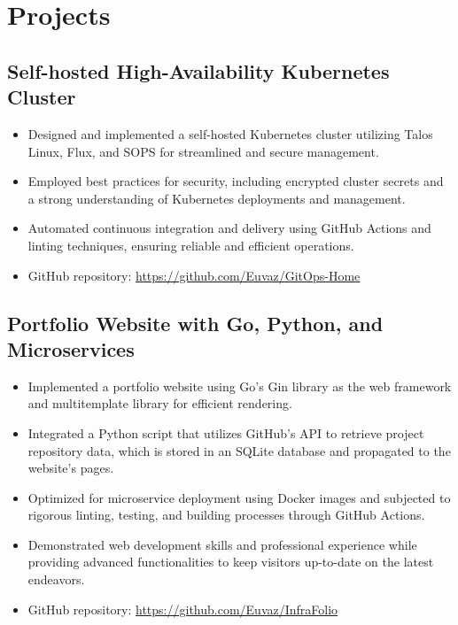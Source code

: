 \documentclass[a4paper]{article}
\begin{document}
\section{Projects}
\subsection{Self-hosted High-Availability Kubernetes Cluster}
\begin{itemize}
    \item Designed and implemented a self-hosted Kubernetes cluster utilizing Talos Linux, Flux, and SOPS for streamlined and secure management.
    \item Employed best practices for security, including encrypted cluster secrets and a strong understanding of Kubernetes deployments and management.
    \item Automated continuous integration and delivery using GitHub Actions and linting techniques, ensuring reliable and efficient operations.
    \item GitHub repository: \url{https://github.com/Euvaz/GitOps-Home}
\end{itemize}

\subsection{Portfolio Website with Go, Python, and Microservices}
\begin{itemize}
    \item Implemented a portfolio website using Go's Gin library as the web framework and multitemplate library for efficient rendering.
    \item Integrated a Python script that utilizes GitHub's API to retrieve project repository data, which is stored in an SQLite database and propagated to the website's pages.
    \item Optimized for microservice deployment using Docker images and subjected to rigorous linting, testing, and building processes through GitHub Actions.
    \item Demonstrated web development skills and professional experience while providing advanced functionalities to keep visitors up-to-date on the latest endeavors.
    \item GitHub repository: \url{https://github.com/Euvaz/InfraFolio}
\end{itemize}
\end{document}
